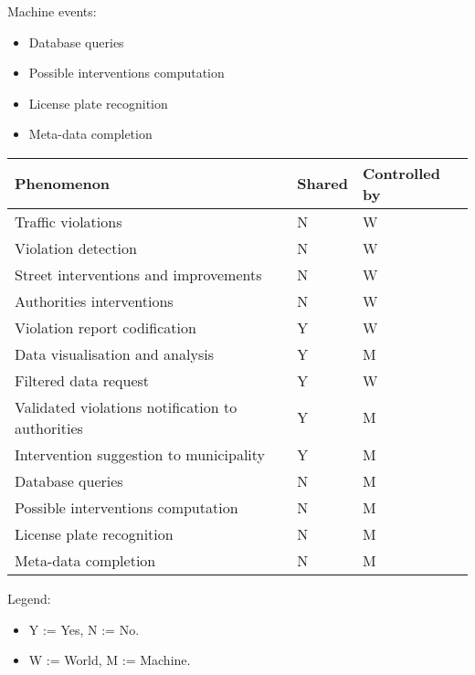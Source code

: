 Machine events:
\begin{itemize}
    \item Database queries
    \item Possible interventions computation
    \item License plate recognition
    \item Meta-data completion
\end{itemize}

\bigskip
\begin{center}
\begin{tabular}{|p{9cm}|l|l|}
	\hline 
	Phenomenon & Shared & Controlled by\\ 
	\hline 
	Traffic violations &  N & W \\ 
	\hline 
	Violation detection &  N & W\\ 
	\hline 
	Street interventions and improvements & N &  W \\ 
	\hline 
	Authorities interventions & N &  W \\
	\hline 
	Violation report codification & Y & W\\ 
	\hline 
	Data visualisation and analysis & Y & M\\ 
	\hline
	Filtered data request & Y & W\\
	\hline 
	Validated violations notification to authorities & Y & M\\ 
	\hline 
	Intervention suggestion to municipality & Y & M\\ 
	\hline 
	Database queries & N & M\\ 
	\hline
	Possible interventions computation & N & M\\ 
	\hline
	License plate recognition & N & M\\ 
	\hline
	Meta-data completion & N & M\\ 
	\hline
\end{tabular} 
\end{center}
Legend:
\begin{itemize}
	\item Y := Yes, N := No.
	\item W := World, M := Machine.
\end{itemize}


